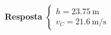 
\textbf{Resposta}
$
\begin{cases}
	h=\SI{23.75}{\meter}\\
	v_{C}=\SI{21.6}{\meter/\second}
\end{cases}
$